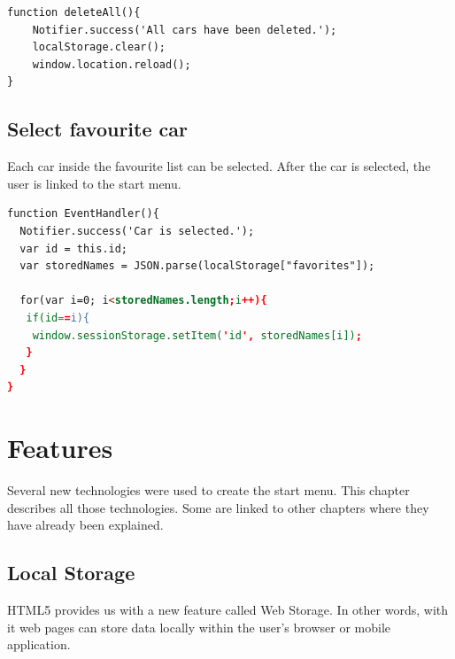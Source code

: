 \begin{lstlisting}[language=html, caption= 
Delete all function,captionpos=b]
function deleteAll(){
    Notifier.success('All cars have been deleted.');
	localStorage.clear();
    window.location.reload();
}
\end{lstlisting}

\subsection{Select favourite car}
Each car inside the favourite list can be selected. After the car is selected, the user is linked to the start menu.
\\

\begin{lstlisting}[language=html, caption=
Select car function,captionpos=b] 
function EventHandler(){
  Notifier.success('Car is selected.');
  var id = this.id;
  var storedNames = JSON.parse(localStorage["favorites"]);
	
  for(var i=0; i<storedNames.length;i++){
   if(id==i){
    window.sessionStorage.setItem('id', storedNames[i]);
   }
  }
}
\end{lstlisting}






















\section{Features}
Several new technologies were used to create the start menu. This chapter describes all those technologies. Some are linked to other chapters where they have already been explained. 
\\

\newpage
\subsection{Local Storage}

HTML5 provides us with a new feature called Web Storage. In other words, with it web pages can store data locally within the user's browser or mobile application.
\\

